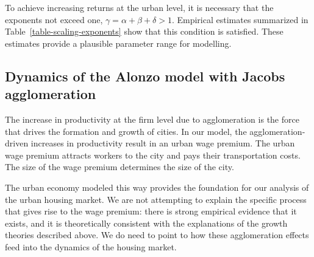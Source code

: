 To achieve increasing returns at the urban level, it is necessary that the exponents not exceed one, $\gamma=\alpha+ \beta + \delta > 1$.  Empirical estimates summarized in Table~\ref{table-scaling-exponents} show that this condition is satisfied. These estimates provide a plausible parameter range for modelling. 


% 
% 
\subsection{Dynamics of the Alonzo model with Jacobs agglomeration}
The increase in productivity at the firm level due to agglomeration is the force that drives the formation and growth of cities. In our model, the agglomeration-driven increases in productivity result in an \gls{urban wage premium}. The urban wage premium attracts workers to the city and pays their transportation costs. The size of the wage premium determines the size of the city.

The urban economy modeled this way provides the foundation for our analysis of the urban housing market. We are not attempting to explain the specific process that gives rise to the wage premium: there is strong empirical evidence that it exists, and it is theoretically consistent with the explanations of the growth theories described above. We do need to point to how these agglomeration effects feed into the dynamics of the housing market.


